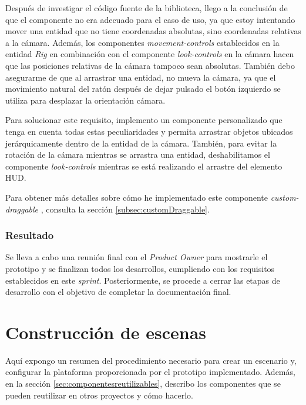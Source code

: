 \documentclass[a4paper, 11pt]{book}
\begin{document}
Después de investigar el código fuente de la biblioteca, llego a la conclusión de que el componente no era adecuado para el caso de uso, ya que estoy intentando mover una entidad que no tiene coordenadas absolutas, sino coordenadas relativas a la cámara. 
Además, los componentes \emph{movement-controls} establecidos en la entidad \emph{Rig} en combinación con el componente \emph{look-controls} en la cámara hacen que las posiciones relativas de la cámara tampoco sean absolutas. También debo asegurarme de que al arrastrar una entidad, no mueva la cámara, ya que el movimiento natural del ratón después de dejar pulsado el botón izquierdo se utiliza para desplazar la orientación cámara.

Para solucionar este requisito, implemento un componente personalizado que tenga en cuenta todas estas peculiaridades y permita arrastrar objetos ubicados jerárquicamente dentro de la entidad de la cámara. También, para evitar la rotación de la cámara mientras se arrastra una entidad, deshabilitamos el componente \emph{look-controls} mientras se está realizando el arrastre del elemento \textsc{\gls{HUD}}.

Para obtener más detalles sobre cómo he implementado este componente \emph{custom-draggable} , consulta la sección \ref{subsec:customDraggable}.

\subsubsection{Resultado}
Se lleva a cabo una reunión final con el \emph{Product Owner} para mostrarle el prototipo y se finalizan todos los desarrollos, cumpliendo con los requisitos establecidos en este \emph{sprint}. Posteriormente, se procede a cerrar las etapas de desarrollo con el objetivo de completar la documentación final. 

\section{Construcción de escenas}
Aquí expongo un resumen del procedimiento necesario para crear un escenario y, configurar la plataforma proporcionada por el prototipo implementado. Además, en la sección \ref{sec:componentesreutilizables}, describo los componentes que se pueden reutilizar en otros proyectos y cómo hacerlo.
\end{document}
